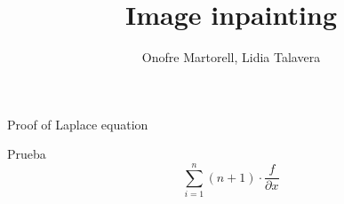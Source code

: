 \documentclass[11pt]{beamer}
\author{Onofre Martorell, Lidia Talavera}
\title{Image inpainting}
\begin{document}
\begin{frame}
\titlepage
\end{frame}


\begin{frame}{Proof of Laplace equation}
\begin{block}{Prueba}
$$\sum_{i=1}^n(n + 1) \cdot \frac{f}{\partial x}$$
\end{block}

\end{frame}
\end{document}
